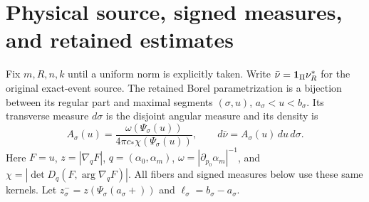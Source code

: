 \section{Physical source, signed measures, and retained estimates}
\label{sec:v94-inputs}
Fix $m,R,n,k$ until a uniform norm is explicitly taken. Write
$\bar\nu=\mathbf1_\Pi\nu_R^*$ for the original exact-event source.
The retained Borel parametrization is a bijection between its regular
part and maximal segments $(\sigma,u)$, $a_\sigma<u<b_\sigma$.
Its transverse measure $d\sigma$ is the disjoint angular measure and
its density is
\[
 A_\sigma(u)=\frac{\omega(\Psi_\sigma(u))}{4\pi c_*\chi(\Psi_\sigma(u))},
 \qquad d\bar\nu=A_\sigma(u)\,du\,d\sigma.
\]
Here $F=u$, $z=|\nabla_qF|$, $q=(\alpha_0,\alpha_m)$,
$\omega=|\partial_{p_0}\alpha_m|^{-1}$, and
$\chi=|\det D_q(F,\arg\nabla_qF)|$. All fibers and signed measures
below use these same kernels. Let $z_\sigma^-=z(\Psi_\sigma(a_\sigma+))$
and $\ell_\sigma=b_\sigma-a_\sigma$.

